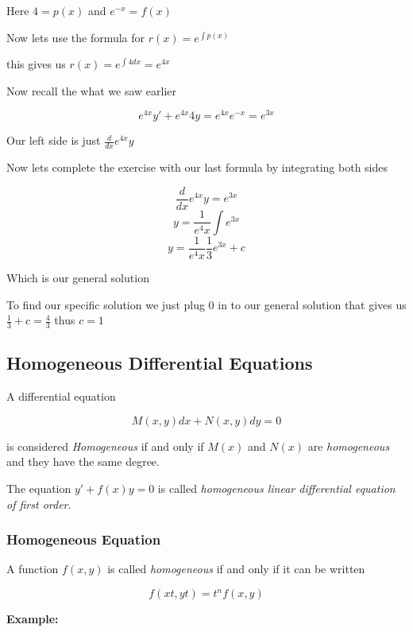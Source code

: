 Here \(4 = p(x)\) and \(e^{-x} = f(x)\)
\vspace{\baselineskip}

Now lets use the formula for \(r(x) = e^{\int p (x)}\)
\vspace{\baselineskip}

this gives us \(r(x) = e^{\int 4dx} = e^{4x}\)
\vspace{\baselineskip}

Now recall the what we saw earlier

\[e^{4x}y' + e^{4x}4y = e^{4x}e^{-x} = e^{3x}\]

Our left side is just \(\frac{d}{dx} e^{4x}y\)
\vspace{\baselineskip}

Now lets complete the exercise with our last formula by integrating both sides

\[\frac{d}{dx} e^{4x}y = e^{3x}\]
\[y = \frac{1}{e^4x}\int e^{3x}\]
\[y = \frac{1}{e^4x} \frac{1}{3}e^{3x} + c\]

Which is our general solution
\vspace{\baselineskip}

To find our specific solution we just plug 0 in to our general solution that gives us
\(\frac{1}{3} + c = \frac{4}{3}\) thus \(c = 1\)

\subsection{Homogeneous Differential Equations}

A differential equation 

\[M(x,y)dx + N(x,y)dy = 0\]

is considered \emph{Homogeneous} if and only if
\(M(x)\) and \(N(x)\) are \emph{homogeneous} and they have the same degree.
\vspace{\baselineskip}

The equation \(y' + f(x)y = 0\) is called \emph{homogeneous linear differential equation of first order}.

\subsubsection{Homogeneous Equation}

A function \(f(x,y)\) is called \emph{homogeneous} if and only if it can be written

\[f(xt, yt) = t^n f(x,y)\]

\textbf{Example: }

